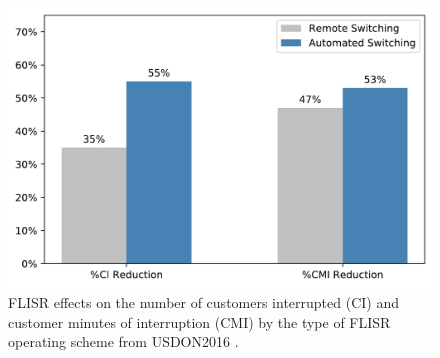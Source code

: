 \begin{figure}
    \centering
	\includegraphics[scale = 0.5]{_introduction/fig/type_scheme.pdf}
	\caption{FLISR effects on the number of customers interrupted (CI) and customer minutes of interruption (CMI) by the type of FLISR operating scheme from USDON2016 \cite{USDepartmentofEnergy2016}.}
	\label{ch-introduction:fig:type_scheme}
\end{figure}